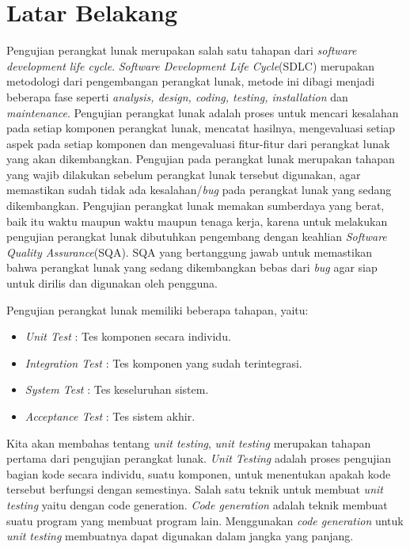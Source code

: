 \documentclass[a4paper,twoside]{article}
\begin{document}
\section{Latar Belakang}
Pengujian perangkat lunak merupakan salah satu tahapan dari \textit{software development life cycle}. \textit{Software Development Life Cycle}(SDLC) merupakan metodologi dari pengembangan perangkat lunak, metode ini dibagi menjadi beberapa fase seperti\textit{ analysis, design,  coding,  testing, installation} dan \textit{maintenance}. Pengujian perangkat lunak adalah proses untuk mencari kesalahan pada setiap komponen perangkat lunak, mencatat hasilnya, mengevaluasi setiap aspek pada setiap komponen dan mengevaluasi fitur-fitur dari perangkat lunak yang akan dikembangkan. Pengujian pada perangkat lunak merupakan tahapan yang wajib dilakukan sebelum perangkat lunak tersebut digunakan, agar memastikan sudah tidak ada kesalahan/\textit{bug} pada perangkat lunak yang sedang dikembangkan. Pengujian perangkat lunak memakan sumberdaya yang berat, baik itu waktu maupun waktu maupun tenaga kerja, karena untuk melakukan pengujian perangkat lunak dibutuhkan pengembang dengan keahlian \textit{Software Quality Assurance}(SQA). SQA yang bertanggung jawab untuk memastikan bahwa perangkat lunak yang sedang dikembangkan bebas dari \textit{bug} agar siap untuk dirilis dan digunakan oleh pengguna.

Pengujian perangkat lunak memiliki beberapa tahapan, yaitu:
\begin{itemize}
	\item \textit{Unit Test} : Tes komponen secara individu.
	\item \textit{Integration Test} : Tes komponen yang sudah terintegrasi.
	\item \textit{System Test} : Tes keseluruhan sistem.
	\item \textit{Acceptance Test} : Tes sistem akhir.
\end{itemize}
Kita akan membahas tentang \textit{unit testing}, \textit{unit testing} merupakan tahapan pertama dari pengujian perangkat lunak. \textit{Unit Testing} adalah proses pengujian bagian kode secara individu, suatu komponen, untuk menentukan apakah kode tersebut berfungsi dengan semestinya. Salah satu teknik untuk membuat \textit{unit testing} yaitu dengan code generation. \textit{Code generation} adalah teknik membuat suatu program yang membuat program lain. Menggunakan \textit{code generation} untuk \textit{unit testing} membuatnya dapat digunakan dalam jangka yang panjang.
\end{document}

